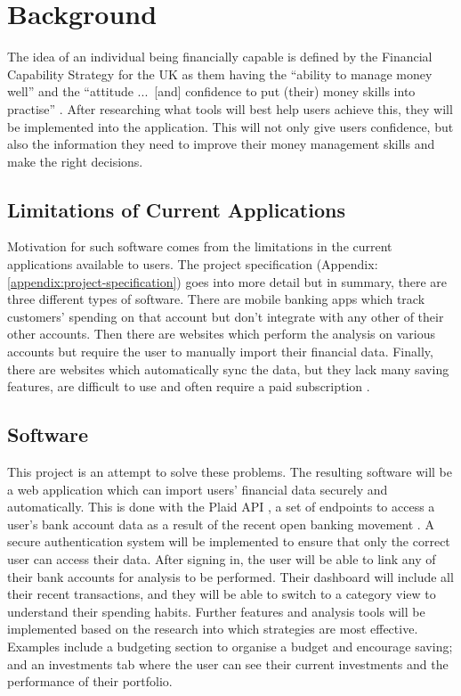 \section{Background}
\label{sec:background}

The idea of an individual being financially capable is defined by the Financial Capability Strategy for the UK as them having the ``ability to manage money well'' and the ``attitude ...\ [and] confidence to put (their) money skills into practise'' \cite{FinancialCapabilityUK}. After researching what tools will best help users achieve this, they will be implemented into the application. This will not only give users confidence, but also the information they need to improve their money management skills and make the right decisions.


\subsection{Limitations of Current Applications}
Motivation for such software comes from the limitations in the current applications available to users. The project specification (Appendix: \ref{appendix:project-specification}) goes into more detail but in summary, there are three different types of software. There are mobile banking apps which track customers' spending on that account but don't integrate with any other of their other accounts. Then there are websites which perform the analysis on various accounts but require the user to manually import their financial data. Finally, there are websites which automatically sync the data, but they lack many saving features, are difficult to use and often require a paid subscription \cite{PersonalFinanceAppsComparison}.

\subsection{Software}
This project is an attempt to solve these problems. The resulting software will be a web application which can import users' financial data securely and automatically. This is done with the Plaid API \cite{Plaid}, a set of endpoints to access a user's bank account data as a result of the recent open banking movement \cite{OpenBanking}. A secure authentication system will be implemented to ensure that only the correct user can access their data. After signing in, the user will be able to link any of their bank accounts for analysis to be performed. Their dashboard will include all their recent transactions, and they will be able to switch to a category view to understand their spending habits. Further features and analysis tools will be implemented based on the research into which strategies are most effective. Examples include a budgeting section to organise a budget and encourage saving; and an investments tab where the user can see their current investments and the performance of their portfolio.

